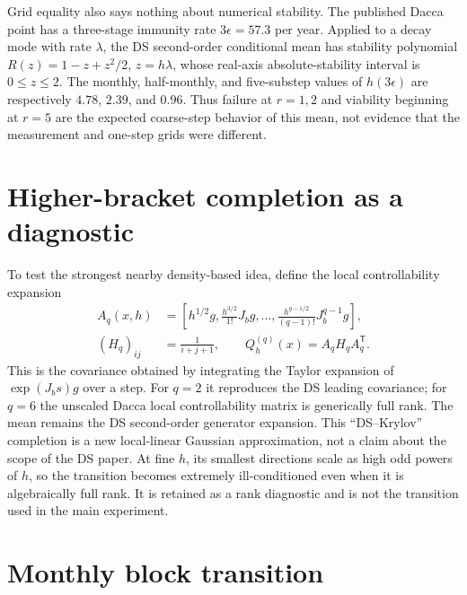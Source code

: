 \documentclass[11pt]{article}
\begin{document}
Grid equality also says nothing about numerical stability.  The published
Dacca point has a three-stage immunity rate $3\epsilon=57.3$ per year.  Applied
to a decay mode with rate $\lambda$, the DS second-order conditional mean has
stability polynomial $R(z)=1-z+z^2/2$, $z=h\lambda$, whose real-axis
absolute-stability interval is $0\leq z\leq2$.  The monthly, half-monthly, and
five-substep values of $h(3\epsilon)$ are respectively $4.78$, $2.39$, and
$0.96$.  Thus failure at $r=1,2$ and viability beginning at $r=5$ are the
expected coarse-step behavior of this mean, not evidence that the measurement
and one-step grids were different.

\section{Higher-bracket completion as a diagnostic}

To test the strongest nearby density-based idea, define the local
controllability expansion
\begin{align}
 A_q(x,h)&=\left[
 h^{1/2}g,\frac{h^{3/2}}{1!}J_bg,\ldots,
 \frac{h^{q-1/2}}{(q-1)!}J_b^{q-1}g\right],\\
 (H_q)_{ij}&=\frac{1}{i+j+1},\qquad
 Q_h^{(q)}(x)=A_qH_qA_q^\mathsf T.
\end{align}
This is the covariance obtained by integrating the Taylor expansion of
$\exp(J_bs)g$ over a step.  For $q=2$ it reproduces the DS leading covariance;
for $q=6$ the unscaled Dacca local controllability matrix is generically full
rank.  The mean remains the DS second-order generator expansion.  This
``DS--Krylov'' completion is a new local-linear Gaussian approximation, not a
claim about the scope of the DS paper.  At fine $h$, its smallest directions
scale as high odd powers of $h$, so the transition becomes extremely
ill-conditioned even when it is algebraically full rank.  It is retained as a
rank diagnostic and is not the transition used in the main experiment.

\section{Monthly block transition}
\end{document}
